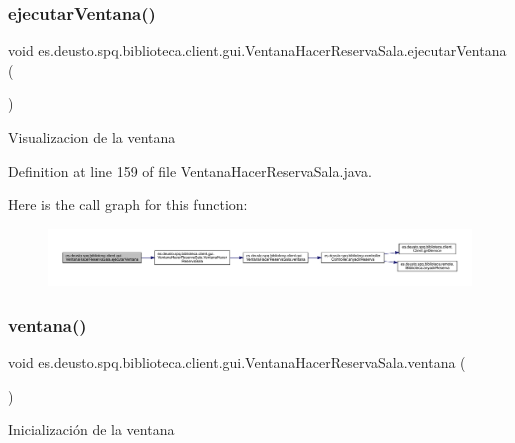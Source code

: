 \subsubsection{\texorpdfstring{ejecutar\+Ventana()}{ejecutarVentana()}}
{\footnotesize\ttfamily void es.\+deusto.\+spq.\+biblioteca.\+client.\+gui.\+Ventana\+Hacer\+Reserva\+Sala.\+ejecutar\+Ventana (\begin{DoxyParamCaption}{ }\end{DoxyParamCaption})}

Visualizacion de la ventana 

Definition at line 159 of file Ventana\+Hacer\+Reserva\+Sala.\+java.

Here is the call graph for this function\+:
\nopagebreak
\begin{figure}[H]
\begin{center}
\leavevmode
\includegraphics[width=350pt]{classes_1_1deusto_1_1spq_1_1biblioteca_1_1client_1_1gui_1_1_ventana_hacer_reserva_sala_aa0a71df04faefeef13b6b7ed91eff04f_cgraph}
\end{center}
\end{figure}
\mbox{\label{classes_1_1deusto_1_1spq_1_1biblioteca_1_1client_1_1gui_1_1_ventana_hacer_reserva_sala_aa5d6c1cf5f1017a242410ad04c5cc876}} 
\subsubsection{\texorpdfstring{ventana()}{ventana()}}
{\footnotesize\ttfamily void es.\+deusto.\+spq.\+biblioteca.\+client.\+gui.\+Ventana\+Hacer\+Reserva\+Sala.\+ventana (\begin{DoxyParamCaption}{ }\end{DoxyParamCaption})}

Inicialización de la ventana 

